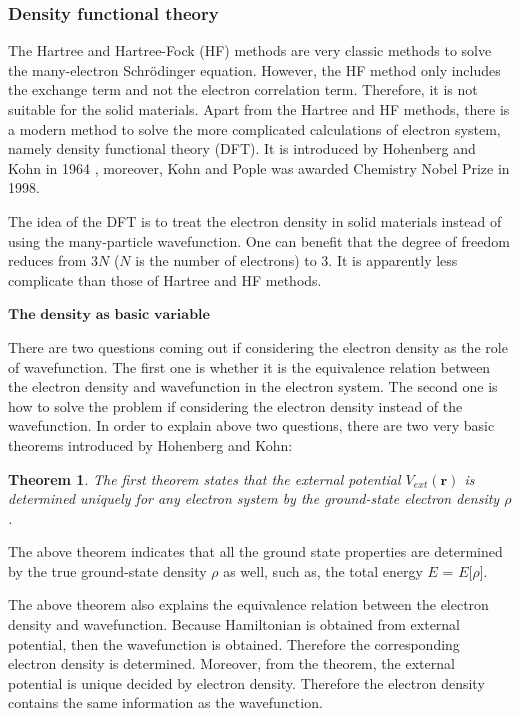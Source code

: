 \documentclass[a4paper, 12pt, titlepage,oneside,drop]{kthesis}
\newtheorem{thm}{Theorem}
\begin{document}
\subsubsection{Density functional theory}
The Hartree and Hartree-Fock (HF) methods are very classic methods to solve the many-electron Schrödinger equation. However, the HF method only includes the exchange term and not the electron correlation term. Therefore, it is not suitable 
for the solid materials. Apart from the Hartree and HF methods, there is a modern method to solve the more complicated calculations of electron system, namely density functional theory (DFT). 
It is introduced by Hohenberg and Kohn in 1964 \cite{hohenberg1964inhomogeneous}, moreover, Kohn and Pople was awarded Chemistry Nobel Prize in 1998.

The idea of the DFT is to treat the electron density in solid materials instead of using the many-particle wavefunction. One can benefit that the degree of freedom reduces from 3$N$ ($N$ is the number of electrons) to 3. It is apparently less 
complicate than those of Hartree and HF methods. 

$\textbf{The density as basic variable}$ 

There are two questions coming out if considering the electron density as the role of wavefunction. The first one is whether it is the equivalence relation between the electron density and wavefunction in the electron system. 
The second one is how to solve the problem if considering the electron density instead of the wavefunction. In order to explain above two questions, there are two very basic theorems introduced by Hohenberg and Kohn:

\begin{thm}
\label{hk1}
\noindent The first theorem states that the external potential $V_{ext}(\textbf{r})$  is determined uniquely for any electron system by the ground-state electron density $\rho$.
\end{thm}

The above theorem indicates that all the ground state properties are determined by the true ground-state density $\rho$ as well,
such as, the total energy $E$ = $E$[$\rho$]. 

The above theorem also explains the equivalence relation between the electron density and wavefunction. Because Hamiltonian is obtained from external potential,
then the wavefunction is obtained. Therefore the corresponding electron density is determined. Moreover, from the theorem, the external potential is unique decided by electron
density. Therefore the electron density contains the same information as the wavefunction.
\end{document}
